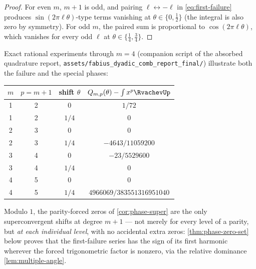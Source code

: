 \documentclass[11pt,oneside]{article}
\numberwithin{equation}{section}
\theoremstyle{definition}
\theoremstyle{remark}
\begin{document}
\begin{proof}
For even $m$, $m+1$ is odd, and pairing $\ell\leftrightarrow-\ell$ in
\eqref{eq:first-failure} produces $\sin(2\pi\ell\theta)$-type terms
vanishing at $\theta\in\{0,\tfrac12\}$ (the integral is also zero by
symmetry).  For odd $m$, the paired sum is proportional to
$\cos(2\pi\ell\theta)$, which vanishes for every odd $\ell$ at
$\theta\in\{\tfrac14,\tfrac34\}$.
\end{proof}

Exact rational experiments through $m=4$ (companion script of the
absorbed quadrature report,
\nolinkurl{assets/fabius_dyadic_comb_report_final/}) illustrate both
the failure and the special phases:

\begin{center}
\small
\begin{tabular}{c c c c}
\toprule
$m$ & $p=m+1$ & shift $\theta$ & $Q_{m,p}(\theta)-\int x^{p}\RvachevUp$ \\
\midrule
1 & 2 & $0$ & $1/72$ \\
1 & 2 & $1/4$ & $0$ \\
2 & 3 & $0$ & $0$ \\
2 & 3 & $1/4$ & $-4643/11059200$ \\
3 & 4 & $0$ & $-23/5529600$ \\
3 & 4 & $1/4$ & $0$ \\
4 & 5 & $0$ & $0$ \\
4 & 5 & $1/4$ & $4966069/383551316951040$ \\
\bottomrule
\end{tabular}
\label{tab:phase-super}
\end{center}

\begin{remark}
\label{conj:phase-classification}
Modulo $1$, the parity-forced zeros of \cref{cor:phase-super} are the
only superconvergent shifts at degree $m+1$ --- not merely for every
level of a parity, but \emph{at each individual level}, with no
accidental extra zeros: \cref{thm:phase-zero-set} below proves that
the first-failure series has the sign of its first harmonic wherever
the forced trigonometric factor is nonzero, via the relative
dominance \cref{lem:multiple-angle}.
\end{remark}
\end{document}
